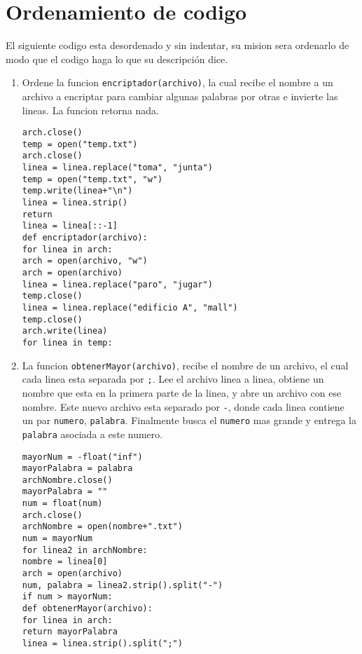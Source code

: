 \section{Ordenamiento de codigo}

El siguiente codigo esta desordenado y sin indentar, su mision sera ordenarlo de modo que el codigo haga lo que su descripción dice.

\begin{enumerate}

\item Ordene la funcion \texttt{encriptador(archivo)}, la cual recibe el nombre a un archivo a encriptar para cambiar algunas palabras por otras e invierte las lineas. La funcion retorna nada.

\begin{lstlisting}[style=consola]
arch.close()
temp = open("temp.txt")
arch.close()
linea = linea.replace("toma", "junta")
temp = open("temp.txt", "w")
temp.write(linea+"\n")
linea = linea.strip()
return
linea = linea[::-1]
def encriptador(archivo):
for linea in arch:
arch = open(archivo, "w")
arch = open(archivo)
linea = linea.replace("paro", "jugar")
temp.close()
linea = linea.replace("edificio A", "mall")
temp.close()
arch.write(linea)
for linea in temp:
\end{lstlisting}


\item La funcion \texttt{obtenerMayor(archivo)}, recibe el nombre de un archivo, el cual cada linea esta separada por \texttt{;}. Lee el archivo linea a linea, obtiene un nombre que esta en la primera parte de la linea, y abre un archivo con ese nombre. Este nuevo archivo esta separado por \texttt{-}, donde cada linea contiene un par \texttt{numero}, \texttt{palabra}. Finalmente busca el \texttt{numero} mas grande y entrega la \texttt{palabra} asociada a este numero.

\begin{lstlisting}[style=consola]
mayorNum = -float("inf")
mayorPalabra = palabra
archNombre.close()
mayorPalabra = ""
num = float(num)
arch.close()
archNombre = open(nombre+".txt")
num = mayorNum
for linea2 in archNombre:
nombre = linea[0]
arch = open(archivo)
num, palabra = linea2.strip().split("-")
if num > mayorNum:
def obtenerMayor(archivo):
for linea in arch:
return mayorPalabra
linea = linea.strip().split(";")
\end{lstlisting}



\end{enumerate}
